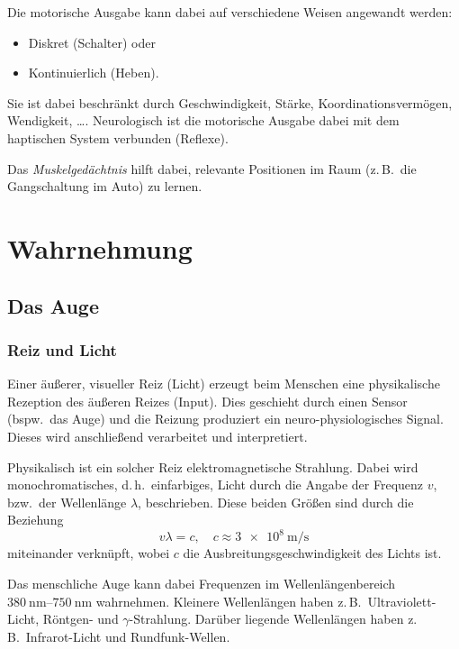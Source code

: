 \documentclass[a4paper, 11pt, accentcolor = tud3b]{tudreport}
\renewcommand{\dh}{d.\,h.~}
\newcommand{\bzw}{bzw.~}
\newcommand{\bspw}{bspw.~}
\newcommand{\zB}{z.\,B.~}
\begin{document}
					Die motorische Ausgabe kann dabei auf verschiedene Weisen angewandt werden:
					\begin{itemize}
						\item Diskret (Schalter) oder
						\item Kontinuierlich (Heben).
					\end{itemize}
					Sie ist dabei beschränkt durch Geschwindigkeit, Stärke, Koordinationsvermögen, Wendigkeit, \dots. Neurologisch ist die motorische Ausgabe dabei mit dem haptischen System verbunden (Reflexe).
					
					Das \emph{Muskelgedächtnis} hilft dabei, relevante Positionen im Raum (\zB die Gangschaltung im Auto) zu lernen.

		\section{Wahrnehmung}
			\subsection{Das Auge}
				\subsubsection{Reiz und Licht}
					Einer äußerer, visueller Reiz (Licht) erzeugt beim Menschen eine physikalische Rezeption des äußeren Reizes (Input). Dies geschieht durch einen Sensor (\bspw das Auge) und die Reizung produziert ein neuro-physiologisches Signal. Dieses wird anschließend verarbeitet und interpretiert.
					
					Physikalisch ist ein solcher Reiz elektromagnetische Strahlung. Dabei wird monochromatisches, \dh einfarbiges, Licht durch die Angabe der Frequenz \(v\), \bzw der Wellenlänge \(\lambda\), beschrieben. Diese beiden Größen sind durch die Beziehung
					\begin{equation*}
						v \lambda = c, \quad c \approx \SI{3e8}{\meter\per\second}
					\end{equation*}
					miteinander verknüpft, wobei \(c\) die Ausbreitungsgeschwindigkeit des Lichts ist.
					
					Das menschliche Auge kann dabei Frequenzen im Wellenlängenbereich \( \SIrange{380}{750}{\nano\meter} \) wahrnehmen. Kleinere Wellenlängen haben \zB Ultraviolett-Licht, Röntgen- und \(\gamma\)-Strahlung. Darüber liegende Wellenlängen haben \zB Infrarot-Licht und Rundfunk-Wellen.
\end{document}
